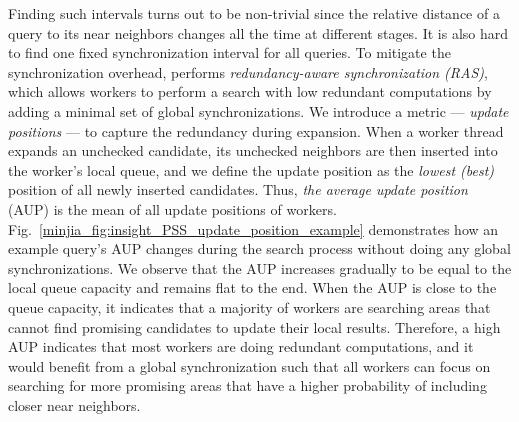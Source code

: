 Finding such intervals turns out to be non-trivial since the relative distance of a query to its near neighbors changes all the time at different stages. It is also hard to find one fixed synchronization interval for all queries. 
To mitigate the synchronization overhead, \Hammer performs \emph{redundancy-aware synchronization (RAS)}, which allows workers to perform a search with low redundant computations by adding a minimal set of global synchronizations. 
We introduce a metric --- \emph{update positions} --- to capture the redundancy during expansion.
When a worker thread expands an unchecked candidate, its unchecked neighbors are then inserted into the worker's local queue, and we define the update position as the \emph{lowest (best)} position of all newly inserted candidates. Thus, \emph{the average update position} (AUP) is the mean of all update positions of workers. 
Fig.~\ref{minjia_fig:insight_PSS_update_position_example} demonstrates how an example query's AUP changes during the search process without doing any global synchronizations. We observe that the AUP increases gradually to be equal to the local queue capacity and remains flat to the end. 
When the AUP is close to the queue capacity, it indicates that a majority of workers are searching areas that cannot find promising candidates to update their local results. Therefore, a high AUP indicates that most workers are doing redundant computations, and it would benefit from a global synchronization such that all workers can focus on searching for more promising areas that have a higher probability of including closer near neighbors. 
